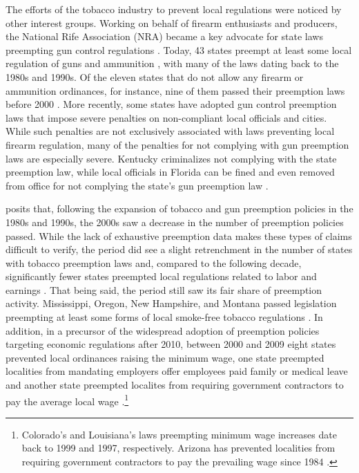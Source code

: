 \documentclass[12pt]{article}
\begin{document}
The efforts of the tobacco industry to prevent local regulations were noticed by other interest groups. Working on behalf of firearm enthusiasts and producers, the National Rife Association (NRA) became a key advocate for state laws preempting gun control regulations \parencite{hicksHomeRuleBe2018}. Today, 43 states preempt at least some local regulation of guns and ammunition \parencite{giffordslawcenterPreemptionLocalLawsn.d.,schraggerStatePreemptionLocal2017}, with many of the laws dating back to the 1980s and 1990s. Of the eleven states that do not allow any firearm or ammunition ordinances, for instance, nine of them passed their preemption laws before 2000 \parencite{schraggerStatePreemptionLocal2017}. More recently, some states have adopted gun control preemption laws that impose severe penalties on non-compliant local officials and cities. While such penalties are not exclusively associated with laws preventing local firearm regulation, many of the penalties for not complying with gun preemption laws are especially severe. Kentucky criminalizes not complying with the state preemption law, while local officials in Florida can be fined and even removed from office for not complying the state's gun preemption law \parencite{briffaultChallengeNewPreemption2018}.

\textcite{hicksHomeRuleBe2018} posits that, following the expansion of tobacco and gun preemption policies in the 1980s and 1990s, the 2000s saw a decrease in the number of preemption policies passed. While the lack of exhaustive preemption data makes these types of claims difficult to verify, the period did see a slight retrenchment in the number of states with tobacco preemption laws and, compared to the following decade, significantly fewer states preempted local regulations related to labor and earnings \parencite{centersfordiseasecontrolStatePreemptionLocal2010,vonwilpertCityGovernmentsAre2017}. That being said, the period still saw its fair share of preemption activity. Mississippi, Oregon, New Hampshire, and Montana passed legislation preempting at least some forms of local smoke-free tobacco regulations \parencite{centersfordiseasecontrolPreemptiveStateSmokeFree2005}. In addition, in a precursor of the widespread adoption of preemption policies targeting economic regulations after 2010, between 2000 and 2009 eight states prevented local ordinances raising the minimum wage, one state preempted localities from mandating employers offer employees paid family or medical leave and another state preempted localites from requiring government contractors to pay the average local wage \parencite{vonwilpertCityGovernmentsAre2017}.\footnote{Colorado's and Louisiana's laws preempting minimum wage increases date back to 1999 and 1997, respectively. Arizona has prevented localities from requiring government contractors to pay the prevailing wage since 1984 \parencite{economicpolicyinstituteWorkerRightsPreemption2018}.}
\end{document}
